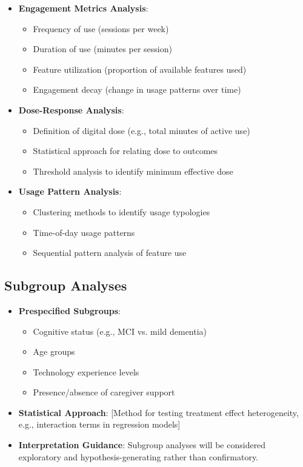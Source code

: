 \begin{itemize}
    \item \textbf{Engagement Metrics Analysis}:
    \begin{itemize}
        \item Frequency of use (sessions per week)
        \item Duration of use (minutes per session)
        \item Feature utilization (proportion of available features used)
        \item Engagement decay (change in usage patterns over time)
    \end{itemize}
    
    \item \textbf{Dose-Response Analysis}:
    \begin{itemize}
        \item Definition of digital dose (e.g., total minutes of active use)
        \item Statistical approach for relating dose to outcomes
        \item Threshold analysis to identify minimum effective dose
    \end{itemize}
    
    \item \textbf{Usage Pattern Analysis}:
    \begin{itemize}
        \item Clustering methods to identify usage typologies
        \item Time-of-day usage patterns
        \item Sequential pattern analysis of feature use
    \end{itemize}
\end{itemize}

\subsection{Subgroup Analyses}

\begin{itemize}
    \item \textbf{Prespecified Subgroups}:
    \begin{itemize}
        \item Cognitive status (e.g., MCI vs. mild dementia)
        \item Age groups
        \item Technology experience levels
        \item Presence/absence of caregiver support
    \end{itemize}
    
    \item \textbf{Statistical Approach}: [Method for testing treatment effect heterogeneity, e.g., interaction terms in regression models]
    
    \item \textbf{Interpretation Guidance}: Subgroup analyses will be considered exploratory and hypothesis-generating rather than confirmatory.
\end{itemize}

